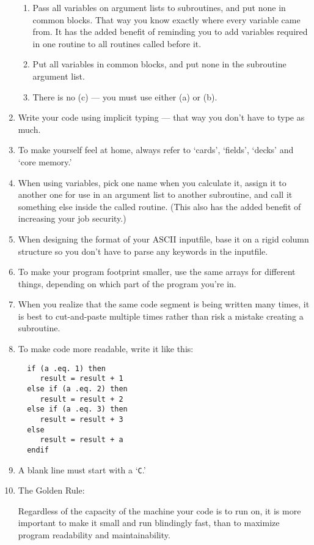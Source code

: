 \documentclass[12pt,letterpaper]{article}
\newcommand{\acro}[1]{{\small #1\spacefactor1000}}
\begin{document}
\begin{enumerate}
   \begin{enumerate}
      \item Pass all variables on argument lists to subroutines, and put none
         in common blocks.  That way you know exactly where every variable
         came from.  It has the added benefit of reminding you to add 
         variables required in one routine to all routines called before it.
      \item Put all variables in common blocks, and put none in the
      subroutine argument list.
      \item There is no (c) --- you must use either (a) or (b).
      \end{enumerate}
\item Write your code using implicit typing --- that way you don't have to type
   as much.
\item To make yourself feel at home, always refer to `cards', `fields',
`decks' and `core memory.'
\item When using variables, pick one name when you calculate it, assign
    it to another one for use in an argument list to another subroutine,
    and call it something else inside the called routine.
    (This also has the added benefit of increasing your job security.)
\item When designing the format of your \acro{ASCII} inputfile, base it on
a rigid column structure so you don't have to parse any keywords in 
the inputfile.
\item To make your program footprint smaller, use the same arrays for
different things, depending on which part of the program you're in.
\item When you realize that the same code segment is being written many
    times, it is best to cut-and-paste multiple times rather than risk a 
    mistake creating a subroutine.
\item To make code more readable, write it like this:

{\ttfamily
\begin{verbatim}
  if (a .eq. 1) then
     result = result + 1
  else if (a .eq. 2) then
     result = result + 2
  else if (a .eq. 3) then
     result = result + 3
  else
     result = result + a
  endif
\end{verbatim}}

\item A blank line must start with a `\texttt{C}.'
\item The Golden Rule: 

      Regardless of the capacity of the machine your code is to run on,
      it is more important to make it small and run blindingly fast,
      than to maximize program readability and maintainability.
\end{enumerate}
\end{document}
